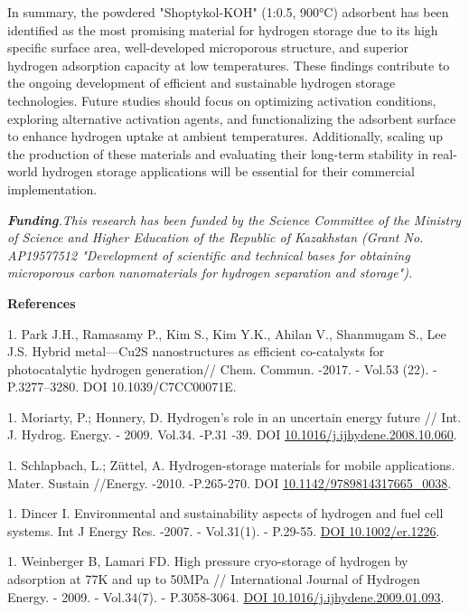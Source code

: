 In summary, the powdered "Shoptykol-KOH" (1:0.5, 900°C) adsorbent has
been identified as the most promising material for hydrogen storage due
to its high specific surface area, well-developed microporous structure,
and superior hydrogen adsorption capacity at low temperatures. These
findings contribute to the ongoing development of efficient and
sustainable hydrogen storage technologies. Future studies should focus
on optimizing activation conditions, exploring alternative activation
agents, and functionalizing the adsorbent surface to enhance hydrogen
uptake at ambient temperatures. Additionally, scaling up the production
of these materials and evaluating their long-term stability in
real-world hydrogen storage applications will be essential for their
commercial implementation.

\emph{{\bfseries Funding}.This research has been funded by the Science
Committee of the Ministry of Science and Higher Education of the
Republic of Kazakhstan (Grant No. AP19577512 "Development of scientific
and technical bases for obtaining microporous carbon nanomaterials for
hydrogen separation and storage").}

{\bfseries References}


1. Park J.H., Ramasamy P., Kim S., Kim Y.K., Ahilan V., Shanmugam S., Lee
J.S. Hybrid metal---Cu2S nanostructures as efficient co-catalysts for
photocatalytic hydrogen generation// Chem. Commun. -2017. - Vol.53
(22). - P.3277--3280. DOI 10.1039/C7CC00071E.

1. Moriarty, P.; Honnery, D. Hydrogen's role in an uncertain energy
future // Int. J. Hydrog. Energy. - 2009. Vol.34. -P.31 -39. DOI
\href{http://dx.doi.org/10.1016/j.ijhydene.2008.10.060}{10.1016/j.ijhydene.2008.10.060}.

1. Schlapbach, L.; Züttel, A. Hydrogen-storage materials for mobile
applications. Mater. Sustain //Energy. -2010. -P.265-270. DOI
\href{http://dx.doi.org/10.1142/9789814317665_0038}{10.1142/9789814317665\_0038}.

1. Dincer I. Environmental and sustainability aspects of hydrogen and
fuel cell systems. Int J Energy Res. -2007. - Vol.31(1). - P.29-55.
\href{https://doi.org/10.1002/er.1226}{DOI 10.1002/er.1226}.

1. Weinberger B, Lamari FD. High pressure cryo-storage of hydrogen by
adsorption at 77K and up to 50MPa // International Journal of Hydrogen
Energy. - 2009. - Vol.34(7). - P.3058-3064.
\href{https://doi.org/10.1016/j.ijhydene.2009.01.093}{DOI
10.1016/j.ijhydene.2009.01.093}.

